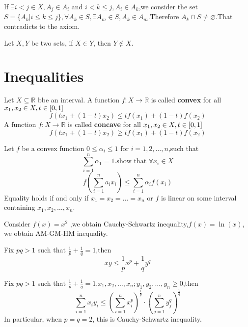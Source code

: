 \documentclass{book}
\numberwithin{equation}{section}
\begin{document}
\begin{proofenv}
    If $\exists i<j\in X,A_j\in A_i$ and $i<k\le j,A_i\in A_k$,we consider the set $S=\{A_k|i\le k\le j\},\forall A_k\in S,\exists A_m\in S,A_k\in A_m$.Therefore $A_k\cap S\not=\varnothing$.That contradicts to the axiom.
\end{proofenv}
\begin{corollaryenv}
    Let $X,Y$ be two sets, if $X\in Y$, then $Y\notin X$.
\end{corollaryenv}


\chapter{Inequalities}
\begin{definitionenv}
    Let $X\subseteq \mathbb{R}$ bbe an interval.
    \newline 
    A function $f:X\rightarrow \mathbb{R}$ is called \textbf{convex} for all $x_1,x_2\in X,t\in \interval{0}{1}$
    $$f(tx_1+(1-t)x_2)\le tf(x_1)+(1-t)f(x_2)$$
    \newline
    A function $f:X\rightarrow \mathbb{R}$ is called \textbf{concave} for all $x_1,x_2\in X,t\in \interval{0}{1}$
    $$f(tx_1+(1-t)x_2)\ge tf(x_1)+(1-t)f(x_2)$$
\end{definitionenv}
\begin{theoremenv}
    Let $f$ be a convex function $0\le \alpha_i\le 1$ for $i=1,2,\dots ,n$,such that 
    $$\sum_{i=1}^{n}\alpha_1=1.\text{show that } \forall x_i\in X$$
    $$f\left(\sum_{i=1}^{n}a_ix_i\right)\le \sum_{i=1}^{n}\alpha_if(x_i)$$
    Equality holds if and only if $x_1=x_2=\dots =x_n$ or $f$ is linear on some interval containing $x_1,x_2,\dots,x_n$.
\end{theoremenv}
\begin{remark}
    Consider $f(x)=x^2$ ,we obtain Cauchy-Schwartz inequality,$f(x)=\ln (x)$, we obtain AM-GM-HM inequality.
\end{remark}
\begin{theoremenv}
    \quad
    \newline
    Fix $pq>1$ such that $\frac{1}{p}+\frac{1}{q}=1$,then
    $$xy\le \frac{1}{p}x^p+\frac{1}{q}y^q$$
\end{theoremenv}
\begin{theoremenv}
    \quad
    \newline
    Fix $pq>1$ such that $\frac{1}{p}+\frac{1}{q}=1$.$x_1,x_2,\dots,x_n;y_1,y_2,\dots,y_n\ge 0$,then
    $$\sum_{i=1}^{n}x_iy_i\le \left(\sum_{i=1}^{n}x_i^p\right)^{\frac{1}{p}}\cdot\left(\sum_{j=1}^{n}y_j^q\right)^{\frac{1}{q}}$$
    In particular, when $p=q=2$, this is Cauchy-Schwartz inequality.
\end{theoremenv}
\end{document}
